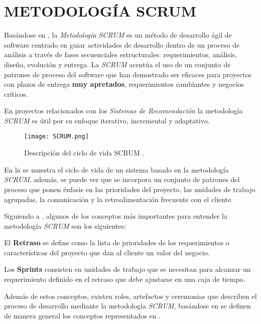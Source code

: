 \section{METODOLOGÍA SCRUM}

Basándose en \parencite{pressman2010ingenieria}, la \textit{Metodología SCRUM} es un método de desarrollo ágil de software centrado en guiar actividades de desarrollo dentro de un proceso de análisis a través de fases secuenciales estructurales: requerimientos, análisis, diseño, evolución y entrega. La \textit{SCRUM} acentúa el uso de un conjunto de patrones de proceso del software que han demostrado ser eficaces para proyectos con plazos de entrega \textbf{muy apretados}, requerimientos cambiantes y negocios críticos. 

En proyectos relacionados con los \textit{Sistemas de Recomendación} la metodología \textit{SCRUM} es útil por su enfoque iterativo, incremental y adaptativo.

\begin{figure}[h!]
    \centering
    \texttt{[image: SCRUM.png]}
    \caption{Descripción del ciclo de vida SCRUM \parencite{pressman2010ingenieria}.}
    \label{fig:SCRUM}
\end{figure}

En la  se muestra el ciclo de vida de un sistema basado en la metodología \textit{SCRUM}, además, se puede ver que se incorpora un conjunto de patrones del proceso que ponen énfasis en las prioridades del proyecto, las unidades de trabajo agrupadas, la comunicación y la retroalimentación frecuente con el cliente.

Siguiendo a \parencite{pressman2010ingenieria}, algunos de los conceptos más importantes para entender la metodología \textit{SCRUM} son los siguientes: 

\newpage

\begin{definition}
    El \textbf{Retraso} se define como la lista de prioridades de los requerimientos o características del proyecto que dan al cliente un valor del negocio.
\end{definition}

\begin{definition}
    Los \textbf{Sprints} consisten en unidades de trabajo que se necesitan para alcanzar un requerimiento definido en el retraso que debe ajustarse en una caja de tiempo.
\end{definition}

Además de estos conceptos, existen roles, artefactos y ceremonias que describen el proceso de desarrollo mediante la metodología \textit{SCRUM}, basándose en \parencite{sachdeva2016scrum} se definen de manera general los conceptos representados en .

